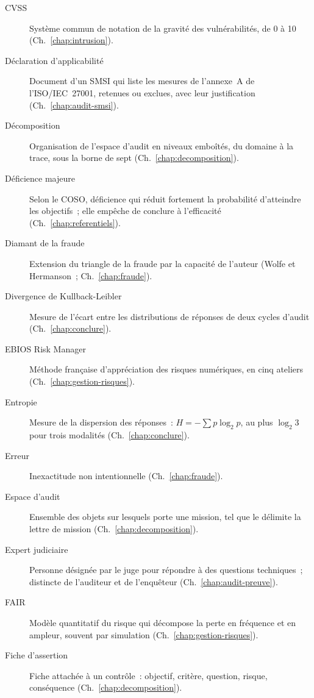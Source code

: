 \begin{description}
    \item[CVSS] Système commun de notation de la gravité des
          vulnérabilités, de 0 à 10 (Ch.~\ref{chap:intrusion}).
    \item[Déclaration d'applicabilité] Document d'un SMSI qui liste les
          mesures de l'annexe~A de l'ISO/IEC~27001, retenues ou exclues,
          avec leur justification (Ch.~\ref{chap:audit-smsi}).
    \item[Décomposition] Organisation de l'espace d'audit en niveaux
          emboîtés, du domaine à la trace, sous la borne de sept
          (Ch.~\ref{chap:decomposition}).
    \item[Déficience majeure] Selon le COSO, déficience qui réduit fortement
          la probabilité d'atteindre les objectifs~; elle empêche de
          conclure à l'efficacité (Ch.~\ref{chap:referentiels}).
    \item[Diamant de la fraude] Extension du triangle de la fraude par la
          capacité de l'auteur (Wolfe et Hermanson~; Ch.~\ref{chap:fraude}).
    \item[Divergence de Kullback-Leibler] Mesure de l'écart entre les
          distributions de réponses de deux cycles d'audit
          (Ch.~\ref{chap:conclure}).
    \item[EBIOS Risk Manager] Méthode française d'appréciation des risques
          numériques, en cinq ateliers (Ch.~\ref{chap:gestion-risques}).
    \item[Entropie] Mesure de la dispersion des réponses~:
          $H = -\sum p \log_2 p$, au plus $\log_2 3$ pour trois modalités
          (Ch.~\ref{chap:conclure}).
    \item[Erreur] Inexactitude non intentionnelle (Ch.~\ref{chap:fraude}).
    \item[Espace d'audit] Ensemble des objets sur lesquels porte une
          mission, tel que le délimite la lettre de mission
          (Ch.~\ref{chap:decomposition}).
    \item[Expert judiciaire] Personne désignée par le juge pour répondre à
          des questions techniques~; distincte de l'auditeur et de
          l'enquêteur (Ch.~\ref{chap:audit-preuve}).
    \item[FAIR] Modèle quantitatif du risque qui décompose la perte en
          fréquence et en ampleur, souvent par simulation
          (Ch.~\ref{chap:gestion-risques}).
    \item[Fiche d'assertion] Fiche attachée à un contrôle~: objectif,
          critère, question, risque, conséquence (Ch.~\ref{chap:decomposition}).

\end{description}
